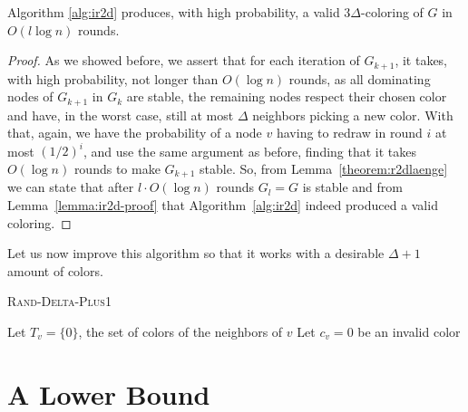 \begin{theorem}\label{theorem:ir2d}
	Algorithm \ref{alg:ir2d} produces, with high probability, a valid $3\Delta$-coloring of $G$ in $O(l \log n)$ rounds.
\end{theorem}
\begin{proof}
	As we showed before, we assert that for each iteration of $G_{k+1}$, it takes, with high probability, not longer than $O(\log n)$ rounds, as all dominating nodes of $G_{k+1}$ in $G_k$ are stable, the remaining nodes respect their chosen color and have, in the worst case, still at most $\Delta$ neighbors picking a new color. With that, again, we have the probability of a node $v$ having to redraw in round $i$ at most $(1/2)^i$, and use the same argument as before, finding that it takes $O(\log n)$ rounds to make $G_{k+1}$ stable. So, from Lemma~\ref{theorem:r2dlaenge} we can state that after $l \cdot O( \log n)$ rounds $G_l = G$ is stable and from Lemma~\ref{lemma:ir2d-proof} that Algorithm~\ref{alg:ir2d} indeed produced a valid coloring.
\end{proof}


Let us now improve this algorithm so that it works with a desirable $\Delta+1$ amount of colors.

\begin{algorithm}[ht]
\DontPrintSemicolon 
\caption{\textsc{Rand-Delta-Plus1}}\label{alg:rd+1}

Let $T_v = \{0\}$, the set of colors of the neighbors of $v$\;
Let $c_v = 0$ be an invalid color\;



\end{algorithm}



\section{A Lower Bound}

